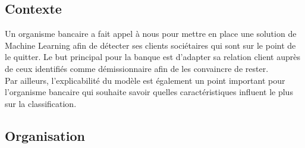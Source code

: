 \documentclass{ceri/sty/rapport}
\begin{document}
\subsection{Contexte}

Un organisme bancaire a fait appel à nous pour mettre en place une solution de Machine Learning afin de détecter ses clients sociétaires qui sont sur le point de le quitter. Le but principal pour la banque est d'adapter sa relation client auprès de ceux identifiés comme démissionnaire afin de les convaincre de rester.\\

Par ailleurs, l'explicabilité du modèle est également un point important pour l'organisme bancaire qui souhaite savoir quelles caractéristiques influent le plus sur la classification.



\subsection{Organisation}
\end{document}
